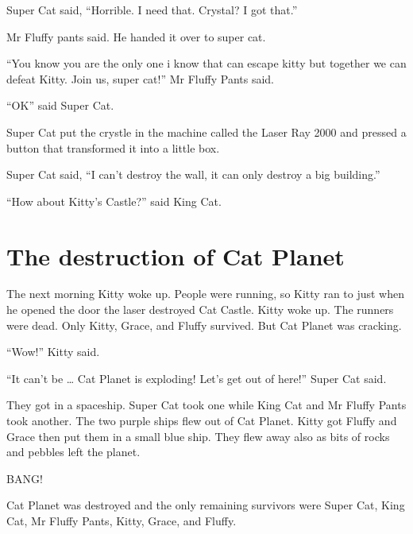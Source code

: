 \documentclass[12pt,oneside]{krantz}
\begin{document}
Super Cat said, ``Horrible. I need that. Crystal? I got that.''

Mr Fluffy pants said. He handed it over to super cat.

``You know you are the only one i know that can escape kitty but
together we can defeat Kitty. Join us, super cat!'' Mr Fluffy Pants
said.

``OK'' said Super Cat.

Super Cat put the crystle in the machine called the Laser Ray 2000 and
pressed a button that transformed it into a little box.

Super Cat said, ``I can't destroy the wall, it can only destroy a big
building.''

``How about Kitty's Castle?'' said King Cat.

\hypertarget{the-destruction-of-cat-planet}{%
\chapter{The destruction of Cat
Planet}\label{the-destruction-of-cat-planet}}

The next morning Kitty woke up. People were running, so Kitty ran to
just when he opened the door the laser destroyed Cat Castle. Kitty woke
up. The runners were dead. Only Kitty, Grace, and Fluffy survived. But
Cat Planet was cracking.

``Wow!'' Kitty said.

``It can't be \ldots{} Cat Planet is exploding! Let's get out of here!''
Super Cat said.

They got in a spaceship. Super Cat took one while King Cat and Mr Fluffy
Pants took another. The two purple ships flew out of Cat Planet. Kitty
got Fluffy and Grace then put them in a small blue ship. They flew away
also as bits of rocks and pebbles left the planet.

BANG!

Cat Planet was destroyed and the only remaining survivors were Super
Cat, King Cat, Mr Fluffy Pants, Kitty, Grace, and Fluffy.
\end{document}
